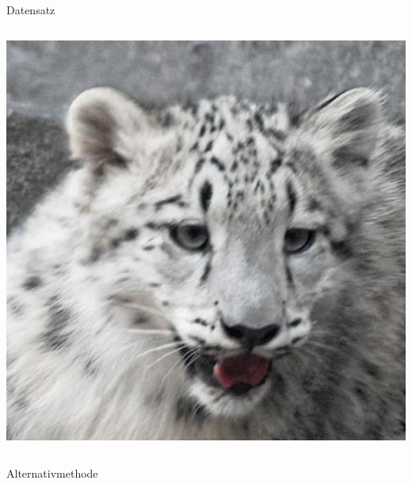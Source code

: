 \documentclass[aspectratio=1610, 9pt]{beamer}
\begin{document}
\begin{frame}{Datensatz}
\begin{columns}
    \includegraphics[scale=0.13]{images/wildlife.jpg}\\

  \end{columns}
\end{frame}

\begin{frame}{Alternativmethode}

  

\end{frame}

%
\end{document}
